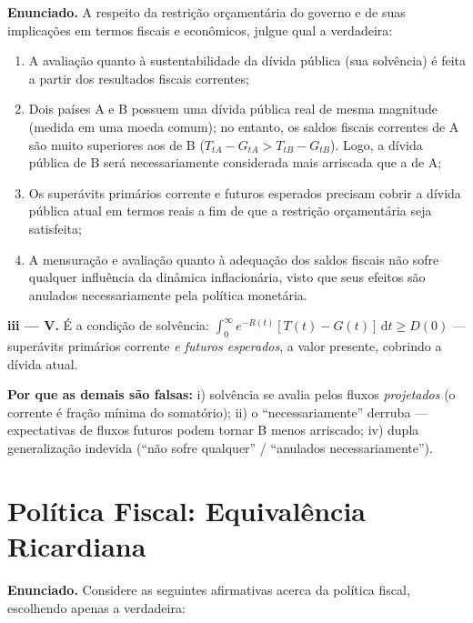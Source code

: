 \documentclass[12pt, a4paper]{article}
\newcommand{\dif}{\mathrm{d}}
\begin{document}
\textbf{Enunciado.} A respeito da restrição orçamentária do governo e de suas
implicações em termos fiscais e econômicos, julgue qual a verdadeira:

\begin{enumerate}[label=\roman*)]
\item A avaliação quanto à sustentabilidade da dívida pública (sua solvência)
é feita a partir dos resultados fiscais correntes;
\item Dois países A e B possuem uma dívida pública real de mesma magnitude
(medida em uma moeda comum); no entanto, os saldos fiscais correntes de A são
muito superiores aos de B ($T_{tA} - G_{tA} > T_{tB} - G_{tB}$). Logo, a
dívida pública de B será necessariamente considerada mais arriscada que a de
A;
\item Os superávits primários corrente e futuros esperados precisam cobrir a
dívida pública atual em termos reais a fim de que a restrição orçamentária
seja satisfeita;
\item A mensuração e avaliação quanto à adequação dos saldos fiscais não sofre
qualquer influência da dinâmica inflacionária, visto que seus efeitos são
anulados necessariamente pela política monetária.
\end{enumerate}

\begin{correctbox}[title={Resposta: iii) --- reciclada: gabarito oficial da P2 2024 (Q6-iii)}]
\textbf{iii --- V.} É a condição de solvência:
$\int_0^\infty e^{-R(t)}[T(t)-G(t)]\,\dif t \geq D(0)$ --- superávits
primários corrente \emph{e futuros esperados}, a valor presente, cobrindo a
dívida atual.

\textbf{Por que as demais são falsas:} i) solvência se avalia pelos fluxos
\emph{projetados} (o corrente é fração mínima do somatório); ii) o
``necessariamente'' derruba --- expectativas de fluxos futuros podem tornar B
menos arriscado; iv) dupla generalização indevida (``não sofre qualquer'' /
``anulados necessariamente'').
\end{correctbox}

\section{Política Fiscal: Equivalência Ricardiana}

\textbf{Enunciado.} Considere as seguintes afirmativas acerca da política
fiscal, escolhendo apenas a verdadeira:
\end{document}
